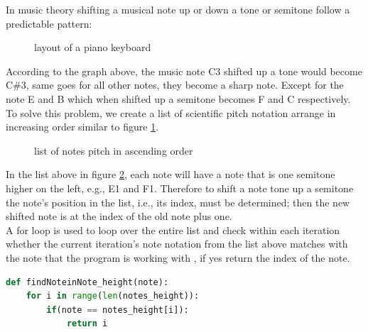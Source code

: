 \documentclass[final]{cvpr}
\begin{document}
In music theory shifting a musical note up or down a tone or semitone follow a
predictable pattern:

\begin{figure}[h]
    \caption{layout of a piano keyboard}
    \label{piano_keyboard}
\end{figure}

According to the graph above, the music note C3 shifted up a tone would become
C\#3, same goes for all other notes, they become a sharp note. Except for the note
E and B which when shifted up a semitone becomes F and C respectively.\\

To solve this problem, we create a list of scientific pitch notation arrange in
increasing order similar to figure \ref{piano_keyboard}.\\

\begin{figure}[h]
\noindent{}
\caption{list of notes pitch in ascending order}
\label{list: note pitch increase}
\end{figure}

In the list above in figure \ref{list: note pitch increase}, each note will have
a note that is one semitone higher on the left, e.g., E1 and F1.  Therefore to
shift a note tone up a semitone the note's position in the list, i.e.,
its index, must be determined; then the new shifted note is at the index of
the old note plus one.\\

A for loop is used to loop over the entire list and check within each
iteration whether the current iteration's note notation from the list above
matches with the note that the program is working with , if yes return the index
of the note.\\

\begin{lstlisting}[language=Python]
def findNoteinNote_height(note):
    for i in range(len(notes_height)):
        if(note == notes_height[i]):
            return i
\end{lstlisting}
\medskip
\end{document}
